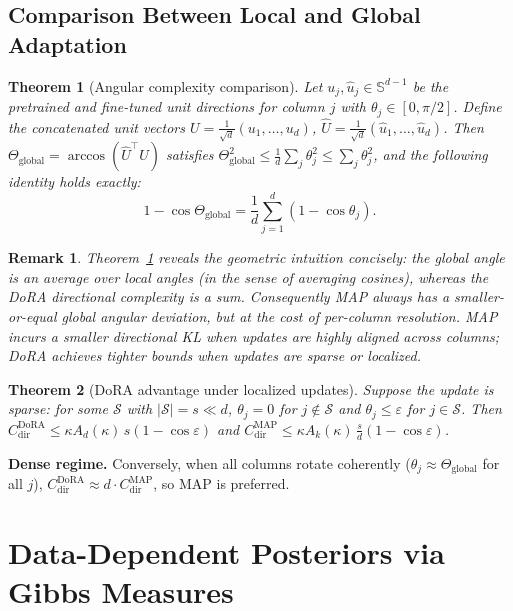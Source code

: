 \documentclass[11pt]{article}
\newtheorem{theorem}{Theorem}
\newtheorem{remark}{Remark}
\newcommand{\Sd}{\mathbb{S}^{d-1}}
\newcommand{\Thetaglob}{\Theta_{\mathrm{global}}}
\begin{document}
\subsection{Comparison Between Local and Global Adaptation}

\begin{theorem}[Angular complexity comparison]\label{thm:comparison}
Let $u_j,\hat u_j\in\Sd$ be the pretrained and fine-tuned unit directions for column
$j$ with $\theta_j\in[0,\pi/2]$. Define the concatenated unit vectors
$U=\frac1{\sqrt d}(u_1,\dots,u_d)$, $\hat U=\frac1{\sqrt d}(\hat u_1,\dots,\hat u_d)$.
Then $\Thetaglob=\arccos(\hat U^\top U)$ satisfies
$\Thetaglob^2\le\frac1d\sum_j\theta_j^2\le\sum_j\theta_j^2$, and the following
identity holds \emph{exactly}:
\begin{equation}\label{eq:identity}
1-\cos\Thetaglob = \frac1d\sum_{j=1}^d(1-\cos\theta_j).
\end{equation}
\end{theorem}

\begin{remark}
Theorem~\ref{thm:comparison} reveals the geometric intuition concisely: the global
angle is an \emph{average} over local angles (in the sense of averaging cosines),
whereas the DoRA directional complexity is a \emph{sum}. Consequently MAP always has
a smaller-or-equal global angular deviation, but at the cost of per-column
resolution. MAP incurs a smaller directional KL when updates are highly aligned
across columns; DoRA achieves tighter bounds when updates are sparse or localized.
\end{remark}

\begin{theorem}[DoRA advantage under localized updates]\label{thm:dora-sparse}
Suppose the update is sparse: for some $\mathcal{S}$ with $|\mathcal{S}|=s\ll d$,
$\theta_j=0$ for $j\notin\mathcal{S}$ and $\theta_j\le\varepsilon$ for
$j\in\mathcal{S}$. Then $C^{\mathrm{DoRA}}_{\mathrm{dir}}\le\kappa A_d(\kappa)\,s(1-\cos\varepsilon)$
and $C^{\mathrm{MAP}}_{\mathrm{dir}}\le\kappa A_k(\kappa)\,\frac{s}{d}(1-\cos\varepsilon)$.
\end{theorem}

\noindent\textbf{Dense regime.} Conversely, when all columns rotate coherently
($\theta_j\approx\Thetaglob$ for all $j$), $C^{\mathrm{DoRA}}_{\mathrm{dir}}\approx
d\cdot C^{\mathrm{MAP}}_{\mathrm{dir}}$, so MAP is preferred.

\section{Data-Dependent Posteriors via Gibbs Measures}\label{sec:gibbs}
\end{document}
